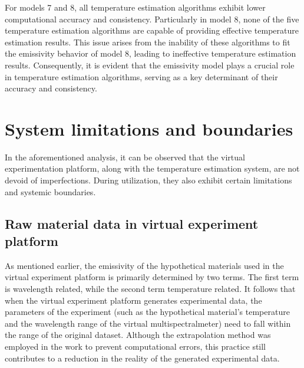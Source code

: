 For models 7 and 8, all temperature estimation algorithms exhibit lower 
computational accuracy and consistency. Particularly in model 8, 
none of the five temperature estimation algorithms are capable of providing 
effective temperature estimation results. This issue arises from the inability 
of these algorithms to fit the emissivity behavior of model 8, leading to 
ineffective temperature estimation results. Consequently, it is evident that the 
emissivity model plays a crucial role in temperature estimation algorithms, 
serving as a key determinant of their accuracy and consistency.


\section{System limitations and boundaries}
In the aforementioned analysis, it can be observed that the virtual 
experimentation platform, along with the temperature estimation system, 
are not devoid of imperfections. During utilization, they also exhibit 
certain limitations and systemic boundaries.


\subsection{Raw material data in virtual experiment platform}
As mentioned earlier, the emissivity of the hypothetical materials used in the virtual experiment 
platform is primarily determined by two terms. The first term is wavelength related, while the 
second term temperature related. It follows that when the virtual experiment platform generates 
experimental data, the parameters of the experiment (such as the hypothetical material's 
temperature and the wavelength range of the virtual multispectralmeter) need to fall within the 
range of the original dataset. Although the extrapolation method was employed in the work to prevent 
computational errors, this practice still contributes to a reduction in the reality 
of the generated experimental data.


